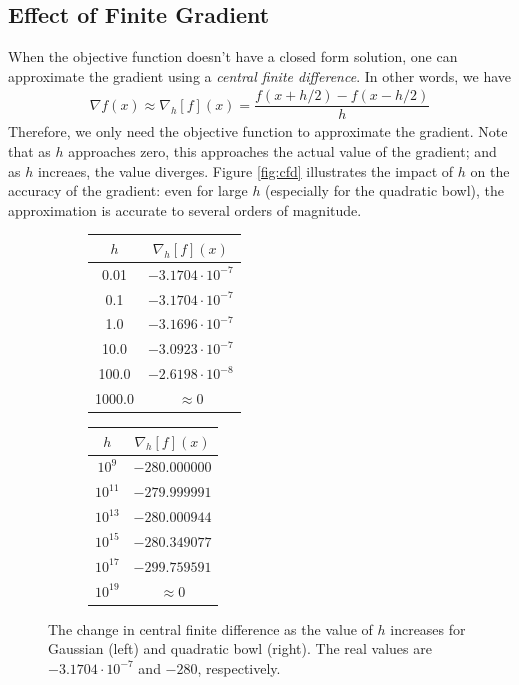 \documentclass[10pt]{paper}
\begin{document}
\subsection{Effect of Finite Gradient}

When the objective function doesn't have a closed form solution, one can approximate the gradient using a \emph{central finite difference}. In other words, we have 
\begin{align*}
\nabla f(x) \approx \nabla_h[f](x) = \dfrac{f(x+h/2) - f(x-h/2)}{h}
\end{align*}
Therefore, we only need the objective function to approximate the gradient. Note that as $h$ approaches zero, this approaches the actual value of the gradient; and as $h$ increaes, the value diverges. Figure \ref{fig:cfd} illustrates the impact of $h$ on the accuracy of the gradient: even for large $h$ (especially for the quadratic bowl), the approximation is accurate to several orders of magnitude.

\begin{figure}[ht!]
  \centering
  \label{fig:cfd}
  \begin{subfigure}
    \centering
      \begin{tabular}{c | c}
      $h$  & $\nabla_h[f](x)$ \\  \hline
    0.01 & $-3.1704 \cdot 10^{-7}$ \\
    0.1 & $-3.1704 \cdot 10^{-7}$ \\
    1.0 & $-3.1696 \cdot 10^{-7}$ \\
    10.0 & $-3.0923 \cdot 10^{-7}$ \\
    100.0 & $-2.6198 \cdot 10^{-8}$ \\
    1000.0 & $\approx 0$ \\
      \end{tabular}
  \end{subfigure}
  \qquad
  \begin{subfigure}
    \centering
      \begin{tabular}{c | c}
      $h$  & $\nabla_h[f](x)$ \\  \hline
    $10^{9}$ & $-280.000000$ \\
    $10^{11}$ & $-279.999991$ \\
    $10^{13}$ & $-280.000944$ \\
    $10^{15}$ & $-280.349077$ \\
    $10^{17}$ & $-299.759591$ \\
    $10^{19}$ & $\approx 0$ \\
      \end{tabular}
  \end{subfigure}
  \caption{The change in central finite difference as the value of $h$ increases for Gaussian (left) and quadratic bowl (right). The real values are $-3.1704 \cdot 10^{-7}$ and $-280$, respectively.}
\end{figure}
\end{document}
